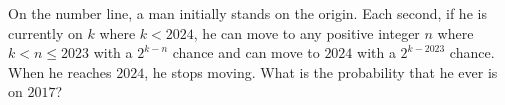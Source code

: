 On the number line, a man initially stands on the origin. Each second, if he is currently on $k$ where $k < 2024$, he can move to any positive integer $n$ where $k < n \le 2023$ with a $2^{k-n}$ chance and can move to $2024$ with a $2^{k-2023}$ chance. When he reaches $2024$, he stops moving. What is the probability that he ever is on $2017$?
